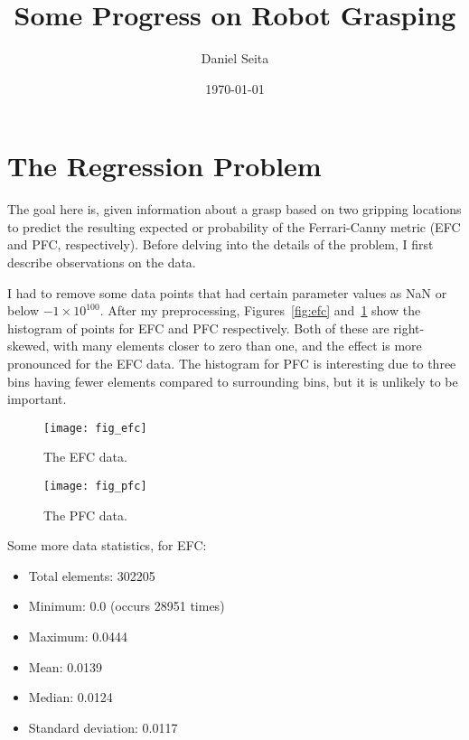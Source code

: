 \documentclass[a4paper, 11pt]{article}
\title{Some Progress on Robot Grasping}
\author{Daniel Seita}
\date{\today}
\begin{document}
\maketitle

\section{The Regression Problem}

The goal here is, given information about a grasp based on two gripping locations to predict the
resulting expected or probability of the Ferrari-Canny metric (EFC and PFC, respectively). Before
delving into the details of the problem, I first describe observations on the data.

I had to remove some data points that had certain parameter values as NaN or below $-1 \times
10^{100}$. After my preprocessing, Figures~\ref{fig:efc} and~\ref{fig:pfc} show the histogram of
points for EFC and PFC respectively.  Both of these are right-skewed, with many elements closer to
zero than one, and the effect is more pronounced for the EFC data. The histogram for PFC is
interesting due to three bins having fewer elements compared to surrounding bins, but it is unlikely
to be important.

\begin{figure}[h]
  \centering
  \begin{minipage}{.48\textwidth}
    \centering
    \texttt{[image: fig\_efc]}
    \caption{The EFC data.}
    \label{fig:efc}
  \end{minipage}\hfill
    \begin{minipage}{.48\textwidth}
    \centering
    \texttt{[image: fig\_pfc]}
    \caption{The PFC data.}
    \label{fig:pfc}
  \end{minipage}
\end{figure}

Some more data statistics, for EFC:

\begin{itemize}[noitemsep]
    \item Total elements: 302205
    \item Minimum: 0.0 (occurs 28951 times)
    \item Maximum: 0.0444
    \item Mean: 0.0139
    \item Median: 0.0124
    \item Standard deviation: 0.0117
\end{itemize}
\end{document}
